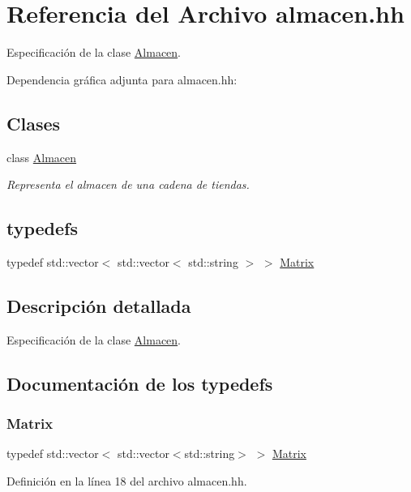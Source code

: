 \hypertarget{almacen_8hh}{}\section{Referencia del Archivo almacen.\+hh}
\label{almacen_8hh}


Especificación de la clase \mbox{\hyperlink{class_almacen}{Almacen}}.  


Dependencia gráfica adjunta para almacen.\+hh\+:
\subsection*{Clases}
\begin{DoxyCompactItemize}
\item 
class \mbox{\hyperlink{class_almacen}{Almacen}}
\begin{DoxyCompactList}\small\item\em Representa el almacen de una cadena de tiendas. \end{DoxyCompactList}\end{DoxyCompactItemize}
\subsection*{typedefs}
\begin{DoxyCompactItemize}
\item 
typedef std\+::vector$<$ std\+::vector$<$ std\+::string $>$ $>$ \mbox{\hyperlink{almacen_8hh_acdf2b2dca71b1d617c96d1afa6a525fa}{Matrix}}
\end{DoxyCompactItemize}


\subsection{Descripción detallada}
Especificación de la clase \mbox{\hyperlink{class_almacen}{Almacen}}. 



\subsection{Documentación de los \textquotesingle{}typedefs\textquotesingle{}}
\mbox{\label{almacen_8hh_acdf2b2dca71b1d617c96d1afa6a525fa}} 
\subsubsection{\texorpdfstring{Matrix}{Matrix}}
{\footnotesize\ttfamily typedef std\+::vector$<$ std\+::vector$<$std\+::string$>$ $>$ \mbox{\hyperlink{almacen_8hh_acdf2b2dca71b1d617c96d1afa6a525fa}{Matrix}}}



Definición en la línea 18 del archivo almacen.\+hh.

